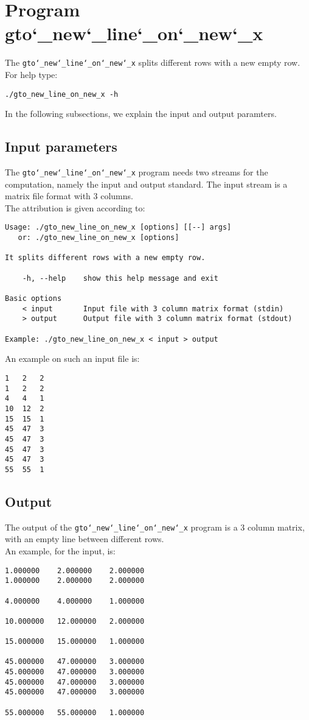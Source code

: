 \section{Program gto\char`_new\char`_line\char`_on\char`_new\char`_x}
The \texttt{gto\char`_new\char`_line\char`_on\char`_new\char`_x} splits different rows with a new empty row.\\
For help type:
\begin{lstlisting}
./gto_new_line_on_new_x -h
\end{lstlisting}
In the following subsections, we explain the input and output paramters.

\subsection*{Input parameters}

The \texttt{gto\char`_new\char`_line\char`_on\char`_new\char`_x} program needs two streams for the computation, namely the input and output standard. The input stream is a matrix file format with 3 columns.\\
The attribution is given according to:
\begin{lstlisting}
Usage: ./gto_new_line_on_new_x [options] [[--] args]
   or: ./gto_new_line_on_new_x [options]

It splits different rows with a new empty row.

    -h, --help    show this help message and exit

Basic options
    < input       Input file with 3 column matrix format (stdin)
    > output      Output file with 3 column matrix format (stdout)

Example: ./gto_new_line_on_new_x < input > output
\end{lstlisting}
An example on such an input file is:
\begin{lstlisting}
1	2	2
1	2	2
4	4	1
10	12	2
15	15	1
45	47	3
45	47	3
45	47	3
45	47	3
55	55	1
\end{lstlisting}

\subsection*{Output}
The output of the \texttt{gto\char`_new\char`_line\char`_on\char`_new\char`_x} program is a 3 column matrix, with an empty line between different rows.\\
An example, for the input, is:
\begin{lstlisting}
1.000000	2.000000	2.000000
1.000000	2.000000	2.000000

4.000000	4.000000	1.000000

10.000000	12.000000	2.000000

15.000000	15.000000	1.000000

45.000000	47.000000	3.000000
45.000000	47.000000	3.000000
45.000000	47.000000	3.000000
45.000000	47.000000	3.000000

55.000000	55.000000	1.000000
\end{lstlisting}
